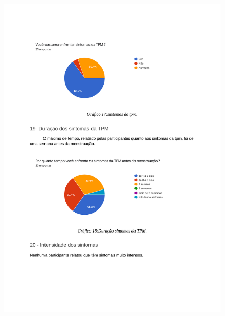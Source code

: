 \begin{apendicesenv}
    \begin{figure}[h]
        \centering
        \includegraphics[keepaspectratio=true,scale=0.7]{figuras/Tab14.pdf}
    \end{figure}
    

\end{apendicesenv}
